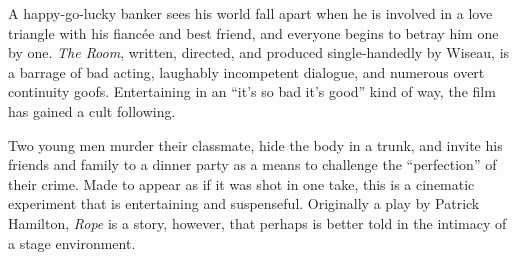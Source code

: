    A happy-go-lucky banker sees his world fall apart when he is involved in a love triangle with his fianc\'ee and best friend, and everyone begins to betray him one by one. \textit{The Room}, written, directed, and produced single-handedly by Wiseau, is a barrage of bad acting, laughably incompetent dialogue, and numerous overt continuity goofs. Entertaining in an ``it's so bad it's good'' kind of way, the film has gained a cult following. \author{DW} 

   Two young men murder their classmate, hide the body in a trunk, and invite his friends and family to a dinner party as a means to challenge the ``perfection'' of their crime. Made to appear as if it was shot in one take, this is a cinematic experiment that is entertaining and suspenseful. Originally a play by Patrick Hamilton, \textit{Rope} is a story, however, that perhaps is better told in the intimacy of a stage environment. \author{DW}
